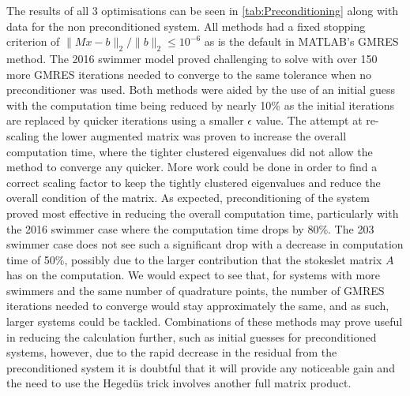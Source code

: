 The results of all 3 optimisations can be seen in \cref{tab:Preconditioning} along with data for the non preconditioned system. All methods had a fixed stopping criterion of $\lVert Mx-b \rVert_2/\lVert b \rVert_2 \leq 10^{-6}$ as is the default in MATLAB's GMRES method. The 2016 swimmer model proved challenging to solve with over 150 more GMRES iterations needed to converge to the same tolerance when no preconditioner was used. Both methods were aided by the use of an initial guess with the computation time being reduced by nearly 10\% as the initial iterations are replaced by quicker iterations using a smaller $\epsilon$ value. The attempt at re-scaling the lower augmented matrix was proven to increase the overall computation time, where the tighter clustered eigenvalues did not allow the method to converge any quicker. More work could be done in order to find a correct scaling factor to keep the tightly clustered eigenvalues and reduce the overall condition of the matrix. 
As expected, preconditioning of the system proved most effective in reducing the overall computation time, particularly with the 2016 swimmer case where the computation time drops by 80\%. The 203 swimmer case does not see such a significant drop with a decrease in computation time of 50\%, possibly due to the larger contribution that the stokeslet matrix $A$ has on the computation. We would expect to see that, for systems with more swimmers and the same number of quadrature points, the number of GMRES iterations needed to converge would stay approximately the same, and as such, larger systems could be tackled. Combinations of these methods may prove useful in reducing the calculation further, such as initial guesses for preconditioned systems, however, due to the rapid decrease in the residual from the preconditioned system it is doubtful that it will provide any noticeable gain and the need to use the Heged{\"u}s trick involves another full matrix product.

